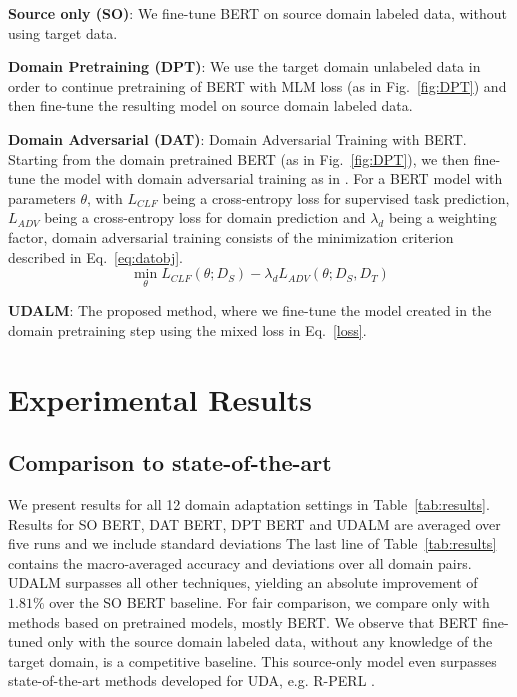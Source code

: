 \documentclass[11pt]{article}
\begin{document}
\noindent \textbf{Source only (SO)}: We fine-tune BERT on source domain labeled data, without using target data. 


\noindent \textbf{Domain Pretraining (DPT)}: We use the target domain unlabeled data in order to continue pretraining of BERT with MLM loss (as in Fig.~\ref{fig:DPT}) and then fine-tune the resulting model on source domain labeled data.


\noindent \textbf{Domain Adversarial (DAT)}: Domain Adversarial Training with BERT. Starting from the domain pretrained BERT (as in Fig.~\ref{fig:DPT}), we then fine-tune the model with domain adversarial training as in \citet{ganin2016domain}. 
For a BERT model with parameters \(\theta\), with \(L_{CLF}\) being a cross-entropy loss for supervised task prediction, \(L_{ADV}\) being a cross-entropy loss for domain prediction and \(\lambda_{d}\) being a weighting factor, domain adversarial training consists of the minimization criterion described in Eq.~\ref{eq:datobj}.
\vspace*{-1mm}
\begin{equation}
\label{eq:datobj}
    \min_{\theta} L_{CLF}(\theta;D_S) - \lambda_{d} L_{ADV}(\theta; D_S, D_T)
\end{equation}
\vspace*{-4mm}

\noindent\textbf{UDALM}: The proposed method, where we fine-tune the model created in the domain pretraining step using the mixed loss in Eq.~\ref{loss}.

\section{Experimental Results}
\subsection{Comparison to state-of-the-art}

We present results for all 12 domain adaptation settings in Table~\ref{tab:results}. 
Results for SO BERT, DAT BERT, DPT BERT and UDALM are averaged over five runs and we include standard deviations
The last line of Table~\ref{tab:results} contains the macro-averaged accuracy and deviations over all domain pairs. UDALM surpasses all other techniques, yielding an absolute improvement of \(1.81\%\) over the SO BERT baseline. For fair comparison, we compare only with methods based on pretrained models, mostly BERT. We observe that BERT fine-tuned only with the source domain labeled data, without any knowledge of the target domain, is a competitive baseline. This source-only model even surpasses state-of-the-art methods developed for UDA, e.g. R-PERL \citep{ben2020perl}.
\end{document}
